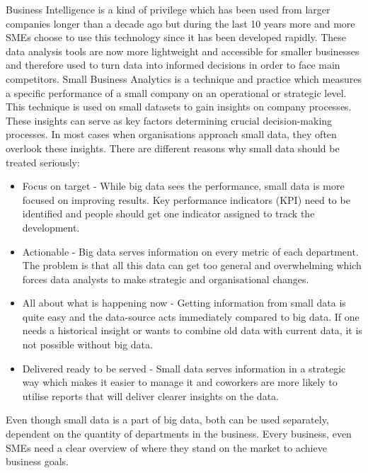 \documentclass[../paper.tex]{subfiles}
\begin{document}
Business Intelligence is a kind of privilege which has been used from larger companies longer than a decade ago but during the last 10 years more and more SMEs choose to use this technology since it has been developed rapidly. These data analysis tools are now more lightweight and accessible for smaller businesses and therefore used to turn data into informed decisions in order to face main competitors. Small Business Analytics  is a technique and practice which measures a specific performance of a small company on an operational or strategic level. This technique is used on small datasets to gain insights on company processes. These insights can serve as key factors determining crucial decision-making processes. In most cases when organisations approach small data, they often overlook these insights. There are different reasons why small data should be treated seriously:
\begin{itemize}
	\item Focus on target - While big data sees the performance, small data is more focused on improving results. Key performance indicators (KPI) need to be identified and people should get one indicator assigned to track the development.
	\item Actionable - Big data serves information on every metric of each department. The problem is that all this data can get too general and overwhelming which forces data analysts to make strategic and organisational changes.
	\item All about what is happening now - Getting information from small data is quite easy and the data-source acts immediately compared to big data. If one needs a historical insight or wants to combine old data with current data, it is not possible without big data.
	\item Delivered ready to be served - Small data serves information in a strategic way which makes it easier to manage it and coworkers are more likely to utilise reports that will deliver clearer insights on the data.
\end{itemize}
Even though small data is a part of big data, both can be used separately, dependent on the quantity of departments in the business. Every business, even SMEs need a clear overview of where they stand on the market to achieve business goals.~\cite{Durcevic2018}
\end{document}
